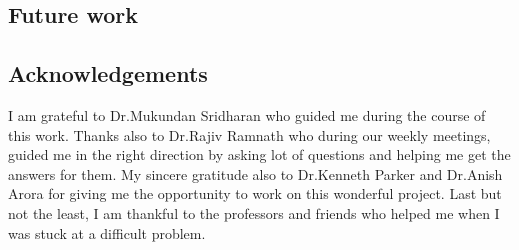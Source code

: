 \subsection*{Future work}
	

\subsection*{Acknowledgements}
	I am grateful to Dr.Mukundan Sridharan who guided me during the course of this work. Thanks also to Dr.Rajiv Ramnath who during our weekly meetings, guided me in the right direction by asking lot of questions and helping me get the answers for them. My sincere gratitude also to Dr.Kenneth Parker and Dr.Anish Arora for giving me the opportunity to work on this wonderful project. Last but not the least, I am thankful to the professors and friends who helped me when I was stuck at a difficult problem. 